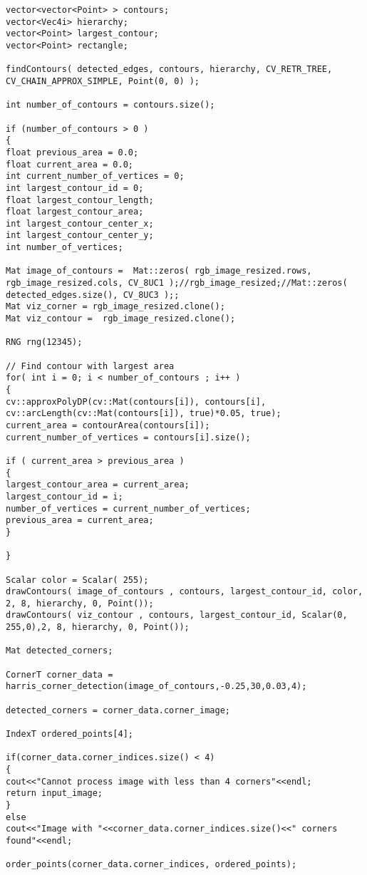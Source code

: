 \begin{lstlisting}
vector<vector<Point> > contours;
vector<Vec4i> hierarchy;
vector<Point> largest_contour;
vector<Point> rectangle;

findContours( detected_edges, contours, hierarchy, CV_RETR_TREE, CV_CHAIN_APPROX_SIMPLE, Point(0, 0) );

int number_of_contours = contours.size();

if (number_of_contours > 0 )
{
float previous_area = 0.0;
float current_area = 0.0;
int current_number_of_vertices = 0;
int largest_contour_id = 0;
float largest_contour_length;
float largest_contour_area;
int largest_contour_center_x;
int largest_contour_center_y;
int number_of_vertices;          

Mat image_of_contours =  Mat::zeros( rgb_image_resized.rows, rgb_image_resized.cols, CV_8UC1 );//rgb_image_resized;//Mat::zeros( detected_edges.size(), CV_8UC3 );;
Mat viz_corner = rgb_image_resized.clone();
Mat viz_contour =  rgb_image_resized.clone();

RNG rng(12345);

// Find contour with largest area
for( int i = 0; i < number_of_contours ; i++ )
{ 
cv::approxPolyDP(cv::Mat(contours[i]), contours[i], cv::arcLength(cv::Mat(contours[i]), true)*0.05, true);
current_area = contourArea(contours[i]);
current_number_of_vertices = contours[i].size();

if ( current_area > previous_area )
{
largest_contour_area = current_area;
largest_contour_id = i;
number_of_vertices = current_number_of_vertices;	
previous_area = current_area;	
}

}

Scalar color = Scalar( 255);
drawContours( image_of_contours , contours, largest_contour_id, color, 2, 8, hierarchy, 0, Point());
drawContours( viz_contour , contours, largest_contour_id, Scalar(0, 255,0),2, 8, hierarchy, 0, Point());	

Mat detected_corners;

CornerT corner_data = harris_corner_detection(image_of_contours,-0.25,30,0.03,4);

detected_corners = corner_data.corner_image;

IndexT ordered_points[4];

if(corner_data.corner_indices.size() < 4)
{
cout<<"Cannot process image with less than 4 corners"<<endl;
return input_image;
}
else
cout<<"Image with "<<corner_data.corner_indices.size()<<" corners found"<<endl;

order_points(corner_data.corner_indices, ordered_points);


\end{lstlisting}
